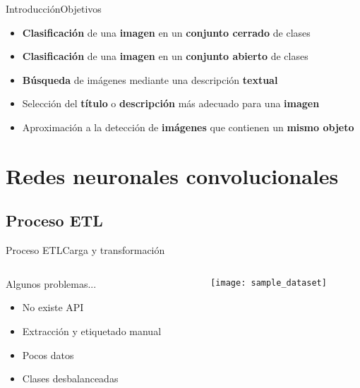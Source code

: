 \documentclass[aspectratio = 169]{beamer}
\begin{document}
			\begin{frame}{Introducción}{Objetivos}
				\begin{block}{}
					\begin{itemize}
						\item \textbf{Clasificación} de una \textbf{imagen} en un \textbf{conjunto cerrado} de clases
						\item \textbf{Clasificación} de una \textbf{imagen} en un \textbf{conjunto abierto} de clases
						\item \textbf{Búsqueda} de imágenes mediante una descripción \textbf{textual}
						\item Selección del \textbf{título} o \textbf{descripción} más adecuado para una \textbf{imagen}
						\item Aproximación a la detección de \textbf{imágenes} que contienen un \textbf{mismo objeto}
					\end{itemize}
				\end{block}
			\end{frame}
	
	\section{Redes neuronales convolucionales}
	
		\subsection{Proceso ETL}
	
			\begin{frame}{Proceso ETL}{Carga y transformación}
				\begin{columns}
					\begin{column}{.5\textwidth}
						\begin{block}{Algunos problemas...}
							\begin{itemize}
								\item No existe API
								\item Extracción y etiquetado manual
								\item Pocos datos
								\item Clases desbalanceadas
							\end{itemize}
						\end{block}
					\end{column}
					\begin{column}{.5\textwidth}
						\begin{figure}
							\centering
							\texttt{[image: sample\_dataset]}
							\label{fig:sample_dataset}
						\end{figure}
					\end{column}
				\end{columns}
			\end{frame}
			
\end{document}
